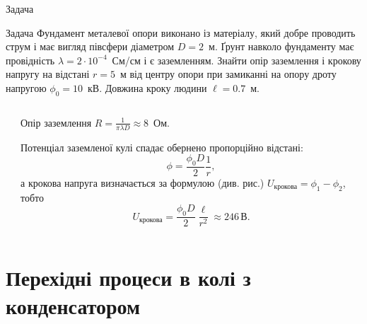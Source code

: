 \documentclass[onlytextwidth]{beamer}
\begin{document}
\begin{frame}{Задача}
	\begin{exampleblock}{Задача}\justifying\scriptsize
		Фундамент металевої опори виконано із матеріалу, який добре проводить струм і має вигляд півсфери діаметром $D = 2$~м. Ґрунт
		навколо фундаменту має провідність $\lambda = 2\cdot 10^{-4}$~См/см і є заземленням. Знайти опір заземлення і крокову напругу на відстані $r = 5$~м
		від центру опори при замиканні на опору дроту напругою $\phi_0 = 10$~кВ. Довжина кроку людини $\ell = 0.7$~м.
	\end{exampleblock}
	\begin{columns}
		\begin{column}{0.6\linewidth}
			\begin{center}
				
			\end{center}
		\end{column}
		\begin{column}{0.4\linewidth}
			\begin{block}{}\justifying\scriptsize
				Опір заземлення $R = \frac{1}{\pi\lambda D} \approx 8$~Ом.

				Потенціал заземленої кулі спадає обернено пропорційно відстані:
				\[
					\phi = \frac{\phi_0 D}{2}\frac{1}{r},
				\]
				а крокова напруга визначається за формулою (див. рис.) $U_\text{крокова} = \phi_1 - \phi_2$, тобто
				\[
					U_\text{крокова} = \frac{\phi_0D}{2}\frac{\ell}{r^2} \approx 246\, \text{В}.
				\]
			\end{block}
		\end{column}
	\end{columns}
\end{frame}


\section{Перехідні процеси в колі з конденсатором}
\end{document}

